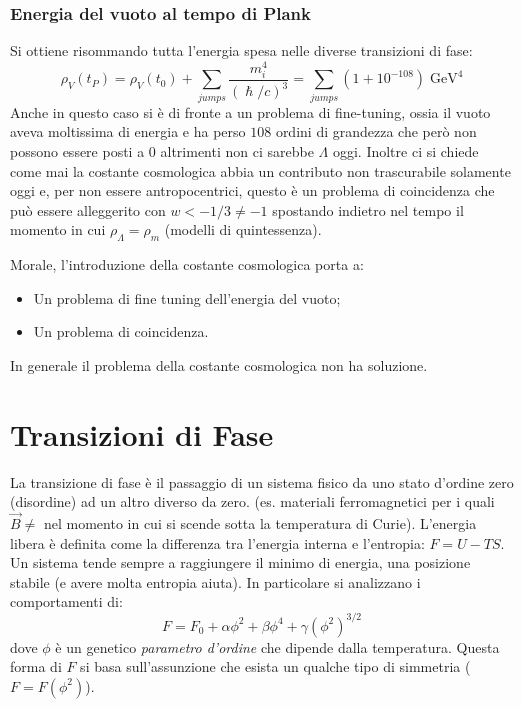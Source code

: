 \subsubsection{Energia del vuoto al tempo di Plank}
Si ottiene risommando tutta l'energia spesa nelle diverse transizioni di fase:
$$
\rho_V (t_P) = \rho_V (t_0) + \sum_{jumps} \frac{m_i^4}{(\hslash / c)^3}= \sum_{jumps} \left ( 1 + 10^{-108}\right)\; \mathrm{GeV^4}
$$
Anche in questo caso si è di fronte a un problema di fine-tuning, ossia il vuoto aveva moltissima di energia e ha perso $108$ ordini di grandezza che però non possono essere posti a $0$ altrimenti non ci sarebbe $\Lambda$ oggi. Inoltre ci si chiede come mai la costante cosmologica abbia un contributo non trascurabile solamente oggi e, per non essere antropocentrici, questo è un problema di coincidenza che può essere alleggerito con $w<-1/3\neq -1$ spostando indietro nel tempo il momento in cui $\rho_\Lambda=\rho_m$ (modelli di quintessenza). 

\vspace{1em}
\noindent Morale, l'introduzione della costante cosmologica porta a:
\begin{itemize}
    \item Un problema di fine tuning dell'energia del vuoto;
    \item Un problema di coincidenza.
\end{itemize}
In generale il problema della costante cosmologica non ha soluzione.


\section{Transizioni di Fase}
La transizione di fase è il passaggio di un sistema fisico da uno stato d'ordine zero (disordine) ad un altro diverso da zero. (es. materiali ferromagnetici per i quali $\vec{B}\neq$ nel momento in cui si scende sotta la temperatura di Curie). L'energia libera è definita come la differenza tra l'energia interna e l'entropia: $F=U-TS$. Un sistema tende sempre a raggiungere il minimo di energia, una posizione stabile (e avere molta entropia aiuta). In particolare si analizzano i comportamenti di:
\begin{equation}
    F=F_0 +\alpha \phi^2 + \beta \phi^4 + \gamma (\phi^2)^{3/2}
\end{equation}
dove $\phi$ è un genetico \textit{parametro d'ordine} che dipende dalla temperatura. Questa forma di $F$ si basa sull'assunzione che esista un qualche tipo di simmetria ($F=F(\phi^2)$).


